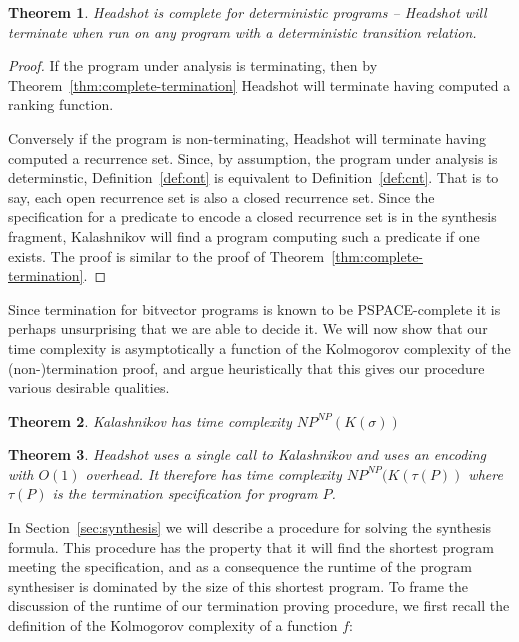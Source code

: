 \documentclass[preprint]{sigplanconf}
\newtheorem{theorem}{Theorem}
\theoremstyle{definition}
\begin{document}
\begin{theorem}
 {\sc Headshot} is complete for deterministic programs -- {\sc Headshot} will terminate when run on
 any program with a deterministic transition relation.
\end{theorem}

\begin{proof}
 If the program under analysis is terminating, then by Theorem~\ref{thm:complete-termination} {\sc Headshot}
 will terminate having computed a ranking function.

 Conversely if the program is non-terminating, {\sc Headshot} will terminate
 having computed a recurrence set.  Since, by assumption, the program under analysis is determinstic,
 Definition~\ref{def:ont} is equivalent to Definition~\ref{def:cnt}.
 That is to say, each open recurrence set is also a closed recurrence set.  Since the specification for a predicate
 to encode a closed recurrence set is in the synthesis fragment, {\sc Kalashnikov} will find a program computing
 such a predicate if one exists.  The proof is similar to the proof of Theorem~\ref{thm:complete-termination}.
\end{proof}


Since termination for bitvector programs is known to be PSPACE-complete \cite{DBLP:conf/tacas/CookKRW10} it
is perhaps unsurprising that we are able to decide it.  We will now show that our time complexity is
asymptotically a function of the Kolmogorov complexity of the (non-)termination proof, and argue heuristically
that this gives our procedure various desirable qualities.

\begin{theorem}
 {\sc Kalashnikov} has time complexity $NP^{NP}(K(\sigma))$
\end{theorem}

\begin{theorem}
 {\sc Headshot} uses a single call to {\sc Kalashnikov} and uses an encoding with $O(1)$
 overhead.  It therefore has time complexity $NP^{NP}(K(\tau(P))$ where $\tau(P)$ is the
 termination specification for program $P$.
\end{theorem}


In Section~\ref{sec:synthesis} we will describe a procedure for solving the synthesis formula.
This procedure has the property that it will find the shortest program meeting the
specification, and as a consequence the runtime of the program synthesiser is dominated
by the size of this shortest program.  To frame the discussion of the runtime of our
termination proving procedure, we first recall the definition of the Kolmogorov complexity
of a function $f$:
\end{document}
